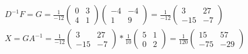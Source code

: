 \documentclass{report}
\begin{document}
\begin{equation}
\begin{split}
& D^{-1}F = G = \frac{1}{-12}\begin{pmatrix}0 & 3\\4 & 1\end{pmatrix}\begin{pmatrix}-4 & -4\\1 & 9\end{pmatrix} = \frac{1}{-12}\begin{pmatrix}3 & 27\\-15 & -7\end{pmatrix}\\
& X = GA^{-1} = \frac{1}{-12}\begin{pmatrix}3 & 27\\-15 & -7\end{pmatrix} * \frac{1}{10}\begin{pmatrix}5 & 1\\0 & 2\end{pmatrix} = \frac{1}{120}\begin{pmatrix}15 & 57\\-75 & -29\end{pmatrix}
\end{split}\end{equation}
\end{document}
